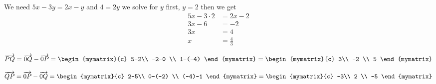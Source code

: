 \begin{enumialphparenastyle}
\begin{ex}
\begin{sol}

We need $5x-3y=2x-y$ and $4=2y$ we solve for $y$ first, $y=2$ then we get 
\begin{align*}
5x-3\cdot 2&=2x-2\\
3x-6&=-2\\
3x&=4\\
x&=\frac{4}{3}
\end{align*}


\begin{equation*}
\longvect{PQ}  = \longvect{0Q} - \longvect{0P}= \begin{mymatrix}{c}
5-2\\
 -2-0 \\
1-(-4)
\end{mymatrix} = \begin{mymatrix}{c}
3\\
 -2 \\
5
\end{mymatrix}
\end{equation*}

\begin{equation*}
\longvect{QP}  = \longvect{0P} - \longvect{0Q}= \begin{mymatrix}{c}
2-5\\
 0-(-2) \\
(-4)-1
\end{mymatrix} = \begin{mymatrix}{c}
-3\\
 2 \\
-5
\end{mymatrix}
\end{equation*}

\end{sol}
\end{ex}


\end{enumialphparenastyle}
